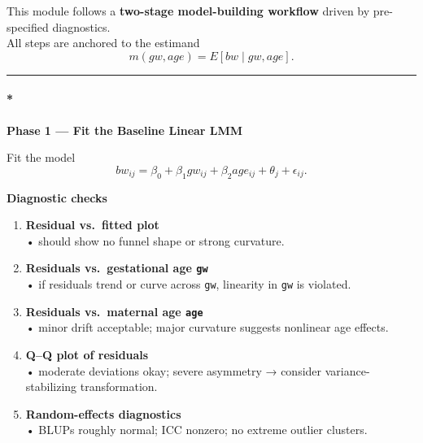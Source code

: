 \documentclass[
  letterpaper,
  DIV=11,
  numbers=noendperiod]{scrreprt}
\let\oldparagraph\paragraph
\renewcommand{\paragraph}[1]{\oldparagraph{#1}\mbox{}}
\begin{document}
\begin{tcolorbox}[enhanced jigsaw, breakable, colbacktitle=quarto-callout-note-color!10!white, left=2mm, colframe=quarto-callout-note-color-frame, opacityback=0, coltitle=black, colback=white, rightrule=.15mm, title={Workflow Summary: Model-Building Algorithm}, titlerule=0mm, opacitybacktitle=0.6, leftrule=.75mm, toprule=.15mm, arc=.35mm, bottomtitle=1mm, toptitle=1mm, bottomrule=.15mm]

This module follows a \textbf{two-stage model-building workflow} driven
by pre-specified diagnostics.\\
All steps are anchored to the estimand\\

\[ m(gw, age) = E[bw \mid gw, age]. \]

\begin{center}\rule{0.5\linewidth}{0.5pt}\end{center}

\hypertarget{phase-1-fit-the-baseline-linear-lmm}{%
\paragraph*{\texorpdfstring{\textbf{Phase 1 --- Fit the Baseline Linear
LMM}}{Phase 1 --- Fit the Baseline Linear LMM}}\label{phase-1-fit-the-baseline-linear-lmm}}

Fit the model\\

\[
bw_{ij} = \beta_0 + \beta_1 gw_{ij} + \beta_2age_{ij} + \theta_j + \epsilon_{ij}. 
\]

\textbf{Diagnostic checks}

\begin{enumerate}
\def\labelenumi{\arabic{enumi}.}
\item
  \textbf{Residual vs.~fitted plot}\\
  • should show no funnel shape or strong curvature.
\item
  \textbf{Residuals vs.~gestational age \texttt{gw}}\\
  • if residuals trend or curve across \texttt{gw}, linearity in
  \texttt{gw} is violated.
\item
  \textbf{Residuals vs.~maternal age \texttt{age}}\\
  • minor drift acceptable; major curvature suggests nonlinear age
  effects.
\item
  \textbf{Q--Q plot of residuals}\\
  • moderate deviations okay; severe asymmetry → consider
  variance-stabilizing transformation.
\item
  \textbf{Random-effects diagnostics}\\
  • BLUPs roughly normal; ICC nonzero; no extreme outlier clusters.
\end{enumerate}


\end{tcolorbox}
\end{document}
